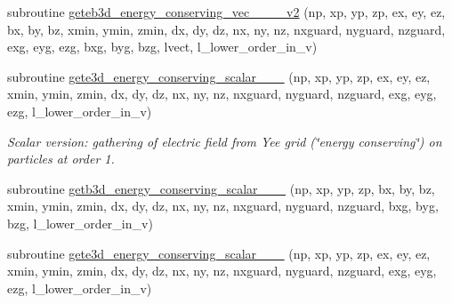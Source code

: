 \begin{DoxyCompactItemize}
\item 
subroutine \hyperlink{field__gathering_8_f90_a6e3a3b1519fdd7090c55244b49a8d80f}{geteb3d\+\_\+energy\+\_\+conserving\+\_\+vec\+\_\+\_\+\_\+\_\+v2} (np, xp, yp, zp, ex, ey, ez, bx, by, bz,                                                                                                                                                                       xmin, ymin, zmin,                                                                                                                                                                                               dx, dy, dz, nx, ny, nz, nxguard, nyguard, nzguard,                                                                                                                                                                       exg, eyg, ezg, bxg, byg, bzg, lvect, l\+\_\+lower\+\_\+order\+\_\+in\+\_\+v)
\item 
subroutine \hyperlink{field__gathering_8_f90_a13e24ff5639b3dcf1e9cd8e51a1caf53}{gete3d\+\_\+energy\+\_\+conserving\+\_\+scalar\+\_\+\_\+\_} (np, xp, yp, zp, ex, ey, ez, xmin, ymin, zmin,                                                                                                                                                           dx, dy, dz, nx, ny, nz, nxguard, nyguard, nzguard,                                                                                                                                                   exg, eyg, ezg, l\+\_\+lower\+\_\+order\+\_\+in\+\_\+v)
\begin{DoxyCompactList}\small\item\em Scalar version\+: gathering of electric field from Yee grid (\char`\"{}energy conserving\char`\"{}) on particles at order 1. \end{DoxyCompactList}\item 
subroutine \hyperlink{field__gathering_8_f90_a35b7fbf406b705b1a34472523046d1b1}{getb3d\+\_\+energy\+\_\+conserving\+\_\+scalar\+\_\+\_\+\_} (np, xp, yp, zp, bx, by, bz, xmin, ymin, zmin,                                                                                                                                                           dx, dy, dz, nx, ny, nz, nxguard, nyguard, nzguard,                                                                                                                                                   bxg, byg, bzg, l\+\_\+lower\+\_\+order\+\_\+in\+\_\+v)
\item 
subroutine \hyperlink{field__gathering_8_f90_aafcef6faa8aa6d61b950249a1285c258}{gete3d\+\_\+energy\+\_\+conserving\+\_\+scalar\+\_\+\_\+\_} (np, xp, yp, zp, ex, ey, ez, xmin, ymin, zmin,                                                                                                                                                           dx, dy, dz, nx, ny, nz, nxguard, nyguard, nzguard,                                                                                                                                                   exg, eyg, ezg, l\+\_\+lower\+\_\+order\+\_\+in\+\_\+v)

\end{DoxyCompactItemize}
